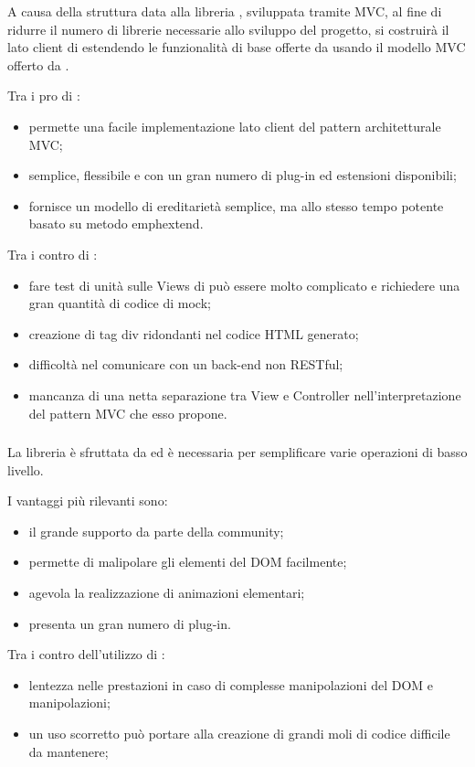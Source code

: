 A causa della struttura data alla libreria \jointjs{}, sviluppata tramite MVC, al fine di ridurre il numero di librerie necessarie allo sviluppo del progetto, si costruirà il lato client di \proj{} estendendo le funzionalità di base offerte da \jointjs{} usando il modello MVC offerto da \backbonejs.

Tra i pro di \backbone{}:
\begin{itemize}
	\item permette una facile implementazione lato client del pattern architetturale MVC;
	\item semplice, flessibile e con un gran numero di plug-in ed estensioni disponibili;
	\item fornisce un modello di ereditarietà semplice, ma allo stesso tempo potente basato su metodo emph{extend}.
\end{itemize}

Tra i contro di \backbone{}:
\begin{itemize}
	\item fare test di unità sulle Views di \backbone{} può essere molto complicato e richiedere una gran quantità di codice di mock;
	\item creazione di tag div ridondanti nel codice HTML generato;
	\item difficoltà nel comunicare con un back-end non RESTful;
	\item mancanza di una netta separazione tra View e Controller nell'interpretazione del pattern MVC che esso propone.
\end{itemize}

\subsubsection{\jquery}
La libreria \jquery{} è sfruttata da \jointjs{} ed è necessaria per semplificare varie operazioni di basso livello.

I vantaggi più rilevanti sono:
\begin{itemize}
	\item il grande supporto da parte della community;
	\item permette di malipolare gli elementi del DOM facilmente;
	\item agevola la realizzazione di animazioni elementari;
	\item presenta un gran numero di plug-in.
\end{itemize}

Tra i contro dell'utilizzo di \jquery{}:
\begin{itemize}
	\item lentezza nelle prestazioni in caso di complesse manipolazioni del DOM e manipolazioni;
	\item un uso scorretto può portare alla creazione di grandi moli di codice difficile da mantenere;
\end{itemize} 

